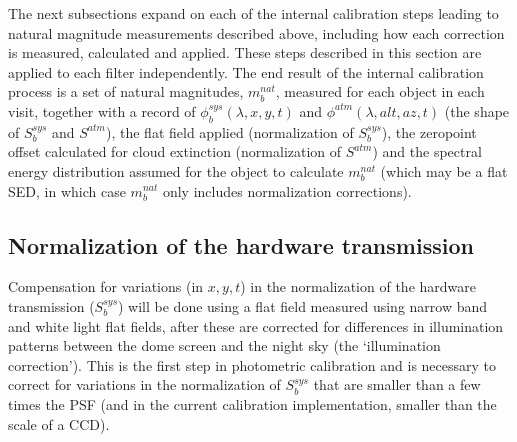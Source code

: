 \documentclass[12pt,preprint]{aastex}
\begin{document}
The next subsections expand on each of the internal calibration steps
leading to natural magnitude measurements described above, including
how each correction is measured, calculated and applied.  These steps
described in this section are applied to each filter
independently. The end result of the internal calibration process is a
set of natural magnitudes, $m_b^{nat}$, measured for each object in
each visit, together with a record of $\phi_b^{sys}(\lambda,x,y,t)$
and $\phi^{atm}(\lambda,alt,az,t)$ (the shape of $S_b^{sys}$ and
$S^{atm}$), the flat field applied (normalization of $S_b^{sys}$), the
zeropoint offset calculated for cloud extinction (normalization of
$S^{atm}$) and the spectral energy distribution assumed for the object
to calculate $m_b^{nat}$ (which may be a flat SED, in which case
$m_b^{nat}$ only includes normalization corrections).

\subsection{Normalization of the hardware transmission}
\label{sec:narrowband}

Compensation for variations (in $x,y,t$) in the normalization of the
hardware transmission ($S_b^{sys}$) will be done using a flat field measured
using narrow band and white light flat fields, after these are
corrected for differences in illumination patterns between the dome
screen and the night sky (the `illumination correction'). This is the
first step in photometric calibration and is necessary to correct for
variations in the normalization of $S_b^{sys}$ that are smaller than a
few times the PSF (and in the current calibration implementation,
smaller than the scale of a CCD).
\end{document}
